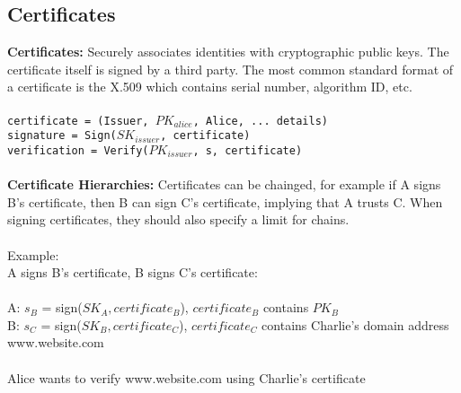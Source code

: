 \documentclass[a4paper,10pt]{article}
\begin{document}
\subsection{Certificates}
\textcolor{RoyalPurple}{\textbf{Certificates:}} Securely associates identities with cryptographic public keys. The certificate itself is signed by a third party. The most common standard format of a certificate is the X.509 which contains serial number, algorithm ID, etc.\\\\
\texttt{certificate = (Issuer, $PK_{alice}$, Alice, ... details)} \\
\texttt{signature = Sign($SK_{issuer}$, certificate)} \\
\texttt{verification = Verify($PK_{issuer}$, s, certificate)}\\\\
\textcolor{RoyalPurple}{\textbf{Certificate Hierarchies:}} Certificates can be chainged, for example if A signs B's certificate, then B can sign C's certificate, implying that A trusts C. When signing certificates, they should also specify a limit for chains. \\\\
Example: \\
A signs B's certificate, B signs C's certificate: \\\\
\indent A: $s_{B}$ = sign($SK_{A}, certificate_{B}$), $certificate_B$ contains $PK_{B}$ \\
\indent B: $s_{C}$ = sign($SK_{B}, certificate_{C}$), $certificate_C$ contains Charlie's domain address www.website.com \\\\
\indent Alice wants to verify www.website.com using Charlie's certificate \\ 
\end{document}
